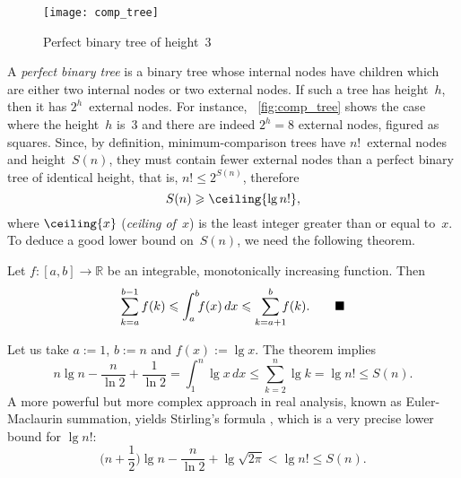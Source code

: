 %
\setlength{\intextsep}{0pt}
\begin{wrapfigure}[]{r}[0pt]{0pt}
\centering
\texttt{[image: comp\_tree]}
\caption{Perfect binary tree of height~\(3\)}
\label{fig:comp_tree}
\end{wrapfigure}
A \emph{perfect binary tree} is a
binary tree whose internal nodes have children which are either two
internal nodes or two external nodes. If such a tree has height~\(h\),
then it has \(2^h\)~external nodes. For instance,
\fig~\vref{fig:comp_tree} shows the case where the height~\(h\)
is~\(3\) and there are indeed \(2^h=8\) external nodes, figured as
squares. Since, by definition, minimum\hyp{}comparison trees have
\(n!\)~external nodes and height~\(S(n)\), they must contain fewer
external nodes than a perfect binary tree of identical height, that
is, \(n! \leqslant 2^{S(n)}\), therefore
\begin{equation*}
S(n) \geqslant \ceiling{\lg n!},
\end{equation*}
where \(\ceiling{x}\) (\textsl{ceiling of~\(x\)})
  is the least integer greater than or equal to~\(x\). To
deduce a good lower bound on~\(S(n)\), we need the following theorem.
\setlength{\intextsep}{12pt}
\begin{thm}
\label{thm:integral_bounds}
Let \(f\colon [a,b] \rightarrow \mathbb{R}\) be an integrable,
monotonically increasing function. Then
\begin{equation}
\abovedisplayskip=0pt
\sum_{k=a}^{b-1}f(k) \leqslant \int_{a}^{b}{\!\!f(x)} \,dx
                   \leqslant \sum_{k=a+1}^{b}{\!\!\!f(k)}.
\tag*{\(\blacksquare\)}
\end{equation}
\end{thm}
\noindent Let us take \(a:=1\), \(b:=n\) and \(f(x) := \lg x\). The
theorem implies
\begin{equation*}
n\lg n - \frac{n}{\ln 2} + \frac{1}{\ln 2}
= \int_{1}^{n}{\!\!\lg x} \,dx \leqslant \sum_{k=2}^{n}{\lg k}
= \lg n! \leqslant S(n).
\end{equation*}
A more powerful but more complex approach in real analysis, known as
Euler-Maclaurin summation, yields Stirling's formula
\citep[chap.~4]{SedgewickFlajolet_1996},
which is a very precise lower bound for \(\lg n!\):
\begin{equation}
\Big(n + \frac{1}{2}\Big)\lg n - \frac{n}{\ln 2} + \lg\sqrt{2\pi}
< \lg n! \leqslant S(n).
\label{ineq:S_lower}
\end{equation}

